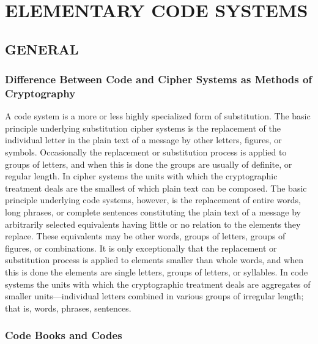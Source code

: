  

 

\chapter{ELEMENTARY CODE SYSTEMS}

 

\section{GENERAL}

\subsection{Difference Between Code and Cipher Systems as Methods of Cryptography}

A code system is a more or less highly specialized form of substitution.
The basic principle underlying substitution cipher systems is the replacement of the individual letter in the plain text of a message by other letters, ﬁgures, or symbols. Occasionally the replacement or substitution
process is applied to groups of letters, and when this is done the groups
are usually of deﬁnite, or regular length. In cipher systems the units
with which the cryptographic treatment deals are the smallest of which
plain text can be composed. The basic principle underlying code systems,
however, is the replacement of entire words, long phrases, or complete
sentences constituting the plain text of a message by arbitrarily selected
equivalents having little or no relation to the elements they replace. These
equivalents may be other words, groups of letters, groups of ﬁgures, or
combinations. It is only exceptionally that the replacement or substitution
process is applied to elements smaller than whole words, and when this
is done the elements are single letters, groups of letters, or syllables. In
code systems the units with which the cryptographic treatment deals are
aggregates of smaller units—individual letters combined in various
groups of irregular length; that is, words, phrases, sentences.

\subsection{Code Books and Codes}

